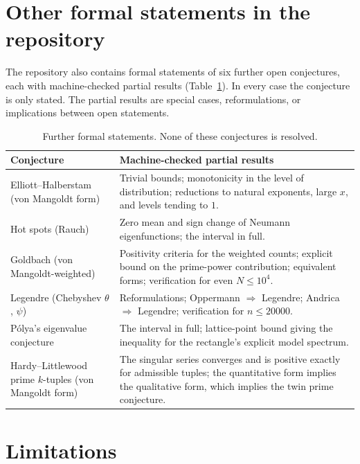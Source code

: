 \documentclass[11pt,a4paper]{article}
\theoremstyle{remark}
\begin{document}
\section{Other formal statements in the repository}

The repository also contains formal statements of six further open conjectures,
each with machine-checked partial results (Table~\ref{tab:other}). In every case
the conjecture is only stated. The partial results are special cases,
reformulations, or implications between open statements.

\begin{table}[ht]
\centering
\small
\begin{tabular}{@{}>{\raggedright}p{}>{\raggedright\arraybackslash}p{}@{}}
\toprule
Conjecture & Machine-checked partial results \\
\midrule
Elliott--Halberstam (von Mangoldt form) &
Trivial bounds; monotonicity in the level of distribution; reductions to
natural exponents, large $x$, and levels tending to $1$. \\
Hot spots (Rauch) &
Zero mean and sign change of Neumann eigenfunctions; the interval in full. \\
Goldbach (von Mangoldt-weighted) &
Positivity criteria for the weighted counts; explicit bound on the prime-power
contribution; equivalent forms; verification for even $N\le 10^4$. \\
Legendre (Chebyshev $\theta$, $\psi$) &
Reformulations; Oppermann $\Rightarrow$ Legendre; Andrica $\Rightarrow$
Legendre; verification for $n\le 20000$. \\
P\'olya's eigenvalue conjecture &
The interval in full; lattice-point bound giving the inequality for the
rectangle's explicit model spectrum. \\
Hardy--Littlewood prime $k$-tuples (von Mangoldt form) &
The singular series converges and is positive exactly for admissible tuples;
the quantitative form implies the qualitative form, which implies the twin
prime conjecture. \\
\bottomrule
\end{tabular}
\caption{Further formal statements. None of these conjectures is resolved.}
\label{tab:other}
\end{table}

\section{Limitations}
\end{document}
